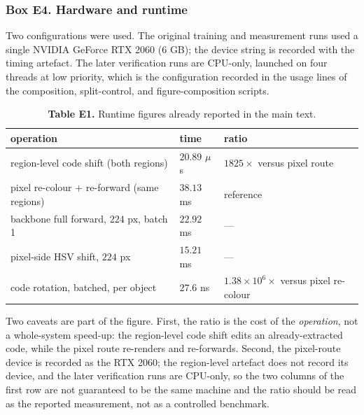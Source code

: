 \subsubsection*{Box E4. Hardware and runtime}

Two configurations were used. The original training and measurement runs used a single NVIDIA GeForce RTX 2060 (6 GB); the device string is recorded with the timing artefact. The later verification runs are CPU-only, launched on four threads at low priority, which is the configuration recorded in the usage lines of the composition, split-control, and figure-composition scripts.


\begin{table}[t]
\centering
\small
\caption*{\textbf{Table E1.} Runtime figures already reported in the main text.}
\begin{tabularx}{\textwidth}{@{}>{\raggedright\arraybackslash}X >{\raggedright\arraybackslash}X >{\raggedright\arraybackslash}X@{}}
\toprule
\textbf{operation} & \textbf{time} & \textbf{ratio} \\
\midrule
region-level code shift (both regions) & $20.89$ $\mu$s & $1825\times$ versus pixel route \\
pixel re-colour + re-forward (same regions) & $38.13$ ms & reference \\
backbone full forward, $224$ px, batch 1 & $22.92$ ms & --- \\
pixel-side HSV shift, $224$ px & $15.21$ ms & --- \\
code rotation, batched, per object & $27.6$ ns & $1.38\times10^{6}\times$ versus pixel re-colour \\
\bottomrule
\end{tabularx}
\end{table}

Two caveats are part of the figure. First, the ratio is the cost of the \textit{operation}, not a whole-system speed-up: the region-level code shift edits an already-extracted code, while the pixel route re-renders and re-forwards. Second, the pixel-route device is recorded as the RTX 2060; the region-level artefact does not record its device, and the later verification runs are CPU-only, so the two columns of the first row are not guaranteed to be the same machine and the ratio should be read as the reported measurement, not as a controlled benchmark.

